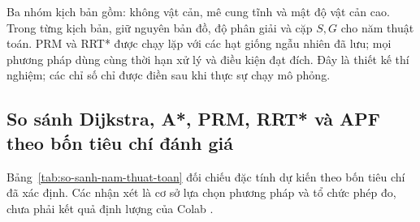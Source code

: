 Ba nhóm kịch bản gồm: không vật cản, mê cung tĩnh và mật độ vật cản cao. Trong từng kịch bản, giữ nguyên bản đồ, độ phân giải và cặp \(S,G\) cho năm thuật toán. PRM và RRT* được chạy lặp với các hạt giống ngẫu nhiên đã lưu; mọi phương pháp dùng cùng thời hạn xử lý và điều kiện đạt đích. Đây là thiết kế thí nghiệm; các chỉ số chỉ được điền sau khi thực sự chạy mô phỏng.

\newpage
\subsection{So sánh Dijkstra, A*, PRM, RRT* và APF theo bốn tiêu chí đánh giá}

Bảng~\ref{tab:so-sanh-nam-thuat-toan} đối chiếu đặc tính dự kiến theo bốn tiêu chí đã xác định. Các nhận xét là cơ sở lựa chọn phương pháp và tổ chức phép đo, chưa phải kết quả định lượng của Colab \cite{lavalle-planning-2006,karaman-frazzoli-2011,khatib-apf-1986}.

